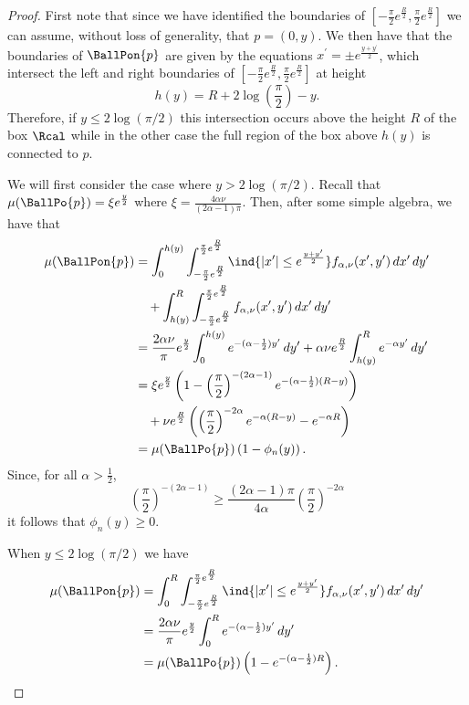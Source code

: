 \begin{proof}
First note that since we have identified the boundaries of $[-\frac{\pi}{2}e^{\frac{R}{2}}, \frac{\pi}{2}e^{\frac{R}{2}}]$ we can assume, without loss of generality, that $p = (0,y)$. We then have that the boundaries of $\BallPon{p}$ are given by the equations $x^\prime = \pm e^{\frac{y+y^\prime}{2}}$, which intersect the left and right boundaries of $[-\frac{\pi}{2}e^{\frac{R}{2}}, \frac{\pi}{2}e^{\frac{R}{2}}]$ at height
\[
	h(y) = R + 2 \log\left(\frac{\pi}{2}\right) - y.
\]
Therefore, if $y \le 2 \log(\pi/2)$ this intersection occurs above the height $R$ of the box $\Rcal$ while in the other case the full region of the box above $h(y)$ is connected to $p$. 

We will first consider the case where $y > 2 \log(\pi/2)$. Recall that $\mu(\BallPo{p}) = \xi e^{\frac{y}{2}}$ where $\xi = \frac{4\alpha \nu}{(2\alpha - 1)\pi}$. Then, after some simple algebra, we have that
\begin{align*}
	\mu(\BallPon{p})
	&= \int_0^{h(y)} \int_{-\frac{\pi}{2}e^{\frac{R}{2}}}^{\frac{\pi}{2}e^{\frac{R}{2}}} 
		\ind{|x^\prime| \le e^{\frac{y+y^\prime}{2}}} f_{\alpha,\nu}(x^\prime,y^\prime) \, dx^\prime \, dy^\prime\\
	&\hspace{10pt}+ \int_{h(y)}^{R} \int_{-\frac{\pi}{2}e^{\frac{R}{2}}}^{\frac{\pi}{2}e^{\frac{R}{2}}} 
		f_{\alpha,\nu}(x^\prime,y^\prime) \, dx^\prime \, dy^\prime\\
	&= \frac{2 \alpha \nu}{\pi} e^{\frac{y}{2}} \int_0^{h(y)} e^{-(\alpha - \frac{1}{2})y^\prime} \, dy^\prime
		+ \alpha \nu e^{\frac{R}{2}} \int_{h(y)}^{R} e^{-\alpha y^\prime} \, dy^\prime \\
	&= \xi e^{\frac{y}{2}}\left(1 - \left(\frac{\pi}{2}\right)^{-(2\alpha - 1)} 
		e^{-(\alpha - \frac{1}{2})(R - y)}\right)\\
	&\hspace{10pt}+ \nu e^{\frac{R}{2}}\left(\left(\frac{\pi}{2}\right)^{-2\alpha} e^{-\alpha(R - y)} 
		- e^{-\alpha R}\right)\\
	&= \mu(\BallPo{p})\left(1 - \phi_n(y)\right).
\end{align*}
Since, for all $\alpha > \frac{1}{2}$,
\[
	\left(\frac{\pi}{2}\right)^{-(2\alpha - 1)} \ge \frac{(2\alpha - 1)\pi}{4\alpha} \left(\frac{\pi}{2}\right)^{-2\alpha}
\]
it follows that $\phi_n(y) \ge 0$.

When $y \le 2 \log(\pi/2)$ we have
\begin{align*}
	\mu(\BallPon{p})
	&= \int_0^{R} \int_{-\frac{\pi}{2}e^{\frac{R}{2}}}^{\frac{\pi}{2}e^{\frac{R}{2}}} 
		\ind{|x^\prime| \le e^{\frac{y+y^\prime}{2}}} f_{\alpha,\nu}(x^\prime,y^\prime) \, dx^\prime \, dy^\prime\\
	&= \frac{2 \alpha \nu}{\pi} e^{\frac{y}{2}} \int_0^{R} e^{-(\alpha - \frac{1}{2})y^\prime} \, dy^\prime\\
	&= \mu(\BallPo{p})\left(1 - e^{-(\alpha - \frac{1}{2})R}\right).
\end{align*}
\end{proof}



